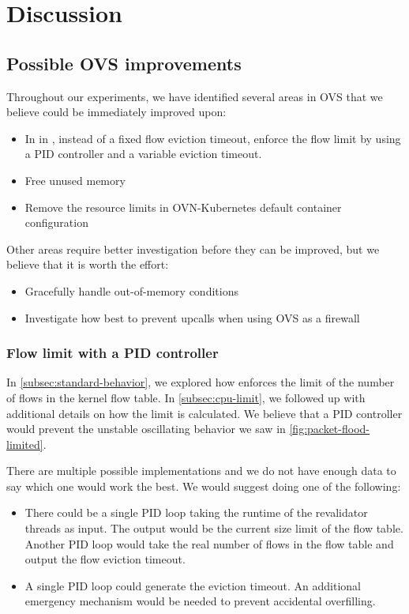 \chapter{Discussion}
\label{chap:discussion}

\section{Possible OVS improvements}
\label{sec:improv}

Throughout our experiments, we have identified several areas in OVS that we believe could be immediately improved upon:

\begin{itemize}
    \item In in , instead of a fixed flow eviction timeout, enforce the flow limit by using a PID controller and a variable eviction timeout.
    \item Free unused memory
    \item Remove the resource limits in OVN-Kubernetes default container configuration
\end{itemize}

Other areas require better investigation before they can be improved, but we believe that it is worth the effort:

\begin{itemize}
    \item Gracefully handle out-of-memory conditions
    \item Investigate how best to prevent upcalls when using OVS as a firewall
\end{itemize}

\subsection{Flow limit with a PID controller}

In \cref{subsec:standard-behavior}, we explored how  enforces the limit of the number of flows in the kernel flow table. In \cref{subsec:cpu-limit}, we followed up with additional details on how the limit is calculated. We believe that a PID controller would prevent the unstable oscillating behavior we saw in \cref{fig:packet-flood-limited}.

There are multiple possible implementations and we do not have enough data to say which one would work the best. We would suggest doing one of the following:

\begin{itemize}
    \item There could be a single PID loop taking the runtime of the revalidator threads as input. The output would be the current size limit of the flow table. Another PID loop would take the real number of flows in the flow table and output the flow eviction timeout.

    \item A single PID loop could generate the eviction timeout. An additional emergency mechanism would be needed to prevent accidental overfilling.
\end{itemize}

